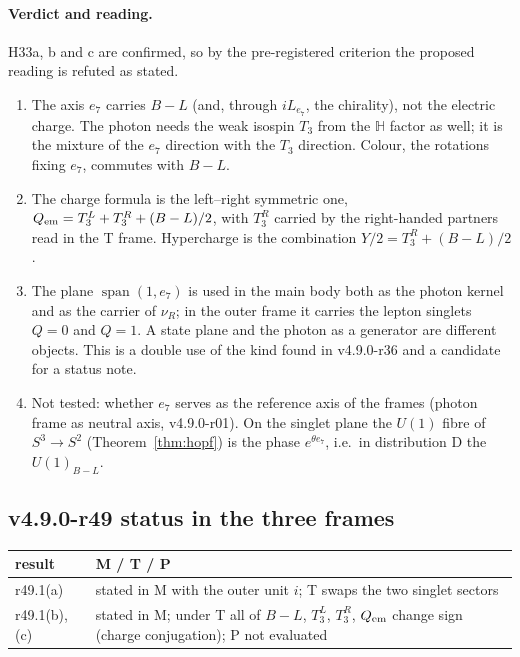 \paragraph{Verdict and reading.}
H33a, b and c are confirmed, so by the pre-registered criterion the proposed reading is refuted as stated.
\begin{enumerate}[leftmargin=2em]
\item The axis \(e_7\) carries \(B-L\) (and, through \(iL_{e_7}\), the chirality), not the electric charge.  The photon needs the weak
isospin \(T_3\) from the \(\mathbb H\) factor as well; it is the mixture of the \(e_7\) direction with the \(T_3\) direction.  Colour, the
rotations fixing \(e_7\), commutes with \(B-L\).
\item The charge formula is the left--right symmetric one, \(Q_{\rm em}=T_3^L+T_3^R+(B-L)/2\), with \(T_3^R\) carried by the right-handed
partners read in the T frame.  Hypercharge is the combination \(Y/2=T_3^R+(B-L)/2\).
\item The plane \(\operatorname{span}(1,e_7)\) is used in the main body both as the photon kernel and as the carrier of \(\nu_R\); in the
outer frame it carries the lepton singlets \(Q=0\) and \(Q=1\).  A state plane and the photon as a generator are different objects.  This
is a double use of the kind found in v4.9.0-r36 and a candidate for a status note.
\item Not tested: whether \(e_7\) serves as the reference axis of the frames (photon frame as neutral axis, v4.9.0-r01).  On the singlet
plane the \(U(1)\) fibre of \(S^3\to S^2\) (Theorem~\ref{thm:hopf}) is the phase \(e^{\theta e_7}\), i.e.\ in distribution D the
\(U(1)_{B-L}\).
\end{enumerate}

\subsection*{v4.9.0-r49 status in the three frames}
\label{subsec:v490-r49-frames}

\begin{center}
\small
\begin{tabular}{@{}>{\raggedright\arraybackslash}p{}>{\raggedright\arraybackslash}p{}@{}}
\toprule
result & M / T / P\\
\midrule
r49.1(a) & stated in M with the outer unit \(i\); T swaps the two singlet sectors\\
r49.1(b), (c) & stated in M; under T all of \(B-L\), \(T_3^L\), \(T_3^R\), \(Q_{\rm em}\) change sign (charge conjugation); P not evaluated\\
\bottomrule
\end{tabular}
\end{center}

